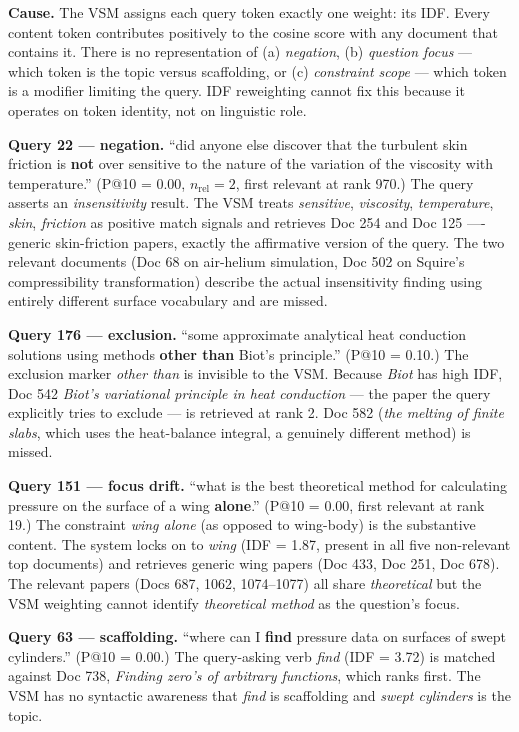\documentclass[11pt]{article}
\begin{document}
\textbf{Cause.} The VSM assigns each query token exactly one weight: its
IDF. Every content token contributes positively to the cosine score with
any document that contains it. There is no representation of (a)
\emph{negation}, (b) \emph{question focus} --- which token is the topic
versus scaffolding, or (c) \emph{constraint scope} --- which token is a
modifier limiting the query. IDF reweighting cannot fix this because it
operates on token identity, not on linguistic role.

\textbf{Query 22 --- negation.} ``did anyone else discover that the
turbulent skin friction is \textbf{not} over sensitive to the nature of the
variation of the viscosity with temperature.'' (P@10 = 0.00,
$n_{\text{rel}}=2$, first relevant at rank 970.) The query asserts an
\emph{insensitivity} result. The VSM treats \emph{sensitive},
\emph{viscosity}, \emph{temperature}, \emph{skin}, \emph{friction} as
positive match signals and retrieves Doc 254 and Doc 125 ---- generic
skin-friction papers, exactly the affirmative version of the query. The
two relevant documents (Doc 68 on air-helium simulation, Doc 502 on
Squire's compressibility transformation) describe the actual insensitivity
finding using entirely different surface vocabulary and are missed.

\textbf{Query 176 --- exclusion.} ``some approximate analytical heat
conduction solutions using methods \textbf{other than} Biot's principle.''
(P@10 = 0.10.) The exclusion marker \emph{other than} is invisible to the
VSM. Because \emph{Biot} has high IDF, Doc 542 \emph{Biot's variational
principle in heat conduction} --- the paper the query explicitly tries to
exclude --- is retrieved at rank 2. Doc 582 (\emph{the melting of finite
slabs}, which uses the heat-balance integral, a genuinely different method)
is missed.

\textbf{Query 151 --- focus drift.} ``what is the best theoretical method
for calculating pressure on the surface of a wing \textbf{alone}.''
(P@10 = 0.00, first relevant at rank 19.) The constraint \emph{wing alone}
(as opposed to wing-body) is the substantive content. The system locks on
to \emph{wing} (IDF = 1.87, present in all five non-relevant top
documents) and retrieves generic wing papers (Doc 433, Doc 251, Doc 678).
The relevant papers (Docs 687, 1062, 1074--1077) all share
\emph{theoretical} but the VSM weighting cannot identify \emph{theoretical
method} as the question's focus.

\textbf{Query 63 --- scaffolding.} ``where can I \textbf{find} pressure
data on surfaces of swept cylinders.'' (P@10 = 0.00.) The query-asking
verb \emph{find} (IDF = 3.72) is matched against Doc 738, \emph{Finding
zero's of arbitrary functions}, which ranks first. The VSM has no
syntactic awareness that \emph{find} is scaffolding and \emph{swept
cylinders} is the topic.
\end{document}
